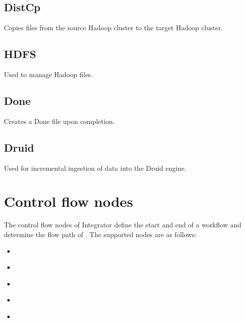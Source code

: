 \documentclass[letterpaper,10pt,english]{sphinxmanual}
\begin{document}
\subsection{DistCp}
\label{\detokenize{integrator/part03/tasks:distcp}}
Copies files from the source Hadoop cluster to the target Hadoop cluster.


\subsection{HDFS}
\label{\detokenize{integrator/part03/tasks:hdfs}}
Used to manage Hadoop files.


\subsection{Done}
\label{\detokenize{integrator/part03/tasks:done}}
Creates a Done file upon completion.


\subsection{Druid}
\label{\detokenize{integrator/part03/tasks:druid}}
Used for incremental ingestion of data into the Druid engine.


\section{Control flow nodes}
\label{\detokenize{integrator/part03/control_flow:control-flow-nodes}}\label{\detokenize{integrator/part03/control_flow:id1}}\label{\detokenize{integrator/part03/control_flow::doc}}
The control flow nodes of Integrator define the start and end of a workflow and determine the flow path of {\hyperref[\detokenize{integrator/part03/tasks:action-nodes}]{}}. The supported nodes are as follows:
\begin{itemize}
\item {} 
{\hyperref[\detokenize{integrator/part03/control_flow:start}]{}}

\item {} 
{\hyperref[\detokenize{integrator/part03/control_flow:end}]{}}

\item {} 
{\hyperref[\detokenize{integrator/part03/control_flow:decision}]{}}

\item {} 
{\hyperref[\detokenize{integrator/part03/control_flow:fork}]{}}

\item {} 
{\hyperref[\detokenize{integrator/part03/control_flow:join}]{}}

\end{itemize}
\end{document}
